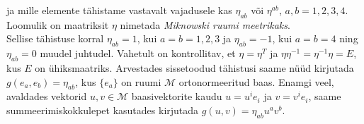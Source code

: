 \documentclass[a4paper,12pt]{article}
\theoremstyle{plain}
\theoremstyle{definition}
\numberwithin{equation}{section}
\begin{document}
ja mille elemente tähistame vastavalt vajadusele kas $\eta_{ab}$ või $\eta^{ab}$, $a, b = 1, 2, 3, 4$. Loomulik on maatriksit $\eta$ nimetada \emph{Miknowski ruumi meetrikaks}.\\
Sellise tähistuse korral $\eta_{ab} = 1$, kui $a = b = 1, 2, 3$ ja $\eta_{ab} = -1$, kui $a = b = 4$ ning $\eta_{ab} = 0$ muudel juhtudel. Vahetult on kontrollitav, et $\eta = \eta^T$ ja $\eta \eta^{-1} = \eta^{-1} \eta = E$, kus $E$ on ühiksmaatriks.
\newline
Arvestades sissetoodud tähistusi saame nüüd kirjutada $g\left(e_a, e_b\right) = \eta_{ab}$, kus $\{e_a\}$ on ruumi $\mathcal{M}$ ortonormeeritud baas. Enamgi veel, avaldades vektorid $u, v \in \mathcal{M}$ baasivektorite kaudu $u = u^i e_i$ ja $v = v^i e_i$, saame summeerimiskokkulepet kasutades kirjutada $g \left(u, v\right) = \eta_{ab} u^a v^b$.
\end{document}
